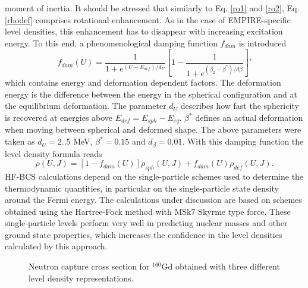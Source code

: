 \documentclass[twocolumn,amsmath,amssymb,10pt,groupedaddress,letter]{revtex4}
\begin{document}
moment of inertia. It should be stressed that similarly to Eq. \ref{ro1}
and \ref{ro2}, Eq. \ref{rhodef} comprises rotational enhancement.
As in the case of EMPIRE-specific level densities,
this enhancement has to disappear with increasing excitation energy.
To this end, a phenomenological damping function $f_{dam}$ is introduced
\begin{equation}
f_{dam}(U)=\frac{1}{1+e^{(U-E_{def})/d_{U}}}\left[1-\frac{1}{1+e^{(\beta_{2}-\beta^{*})/d\beta}}\right]'
\label{dampgor}
\end{equation}
 which contains energy and deformation dependent factors. The deformation
energy is the difference between the energy in the spherical configuration
and at the equilibrium deformation. The parameter $d_{U}$ describes
how fast the sphericity is recovered at energies above $E_{def}=E_{sph}-E_{eq}$.
$\beta^{*}$ defines an actual deformation when moving between spherical
and deformed shape. The above parameters were taken as $d_{U}=2..5$
MeV, $\beta^{*}=0.15$ and $d_{\beta}=0.01$. With this damping function
the level density formula reads
\begin{equation}
\rho(U,J)=\left[1-f_{dam}(U)\right]\rho_{sph}(U,J)+f_{dam}(U)\rho_{def}(U,J).
\label{rogor}
\end{equation}
HF-BCS calculations depend on the single-particle schemes
used to determine the thermodynamic quantities, in particular on the
single-particle state density around the Fermi energy. The calculations
under discussion are based on schemes obtained using the Hartree-Fock
method with MSk7 Skyrme type force. These single-particle levels perform
very well in predicting nuclear masses and other ground state properties,
which increases the confidence in the level densities
calculated by this approach.
\begin{figure}[htbp]
\caption{Neutron capture cross section for $^{160}$Gd obtained with three different
level density representations.}
\label{levdens}
\end{figure}
\end{document}
